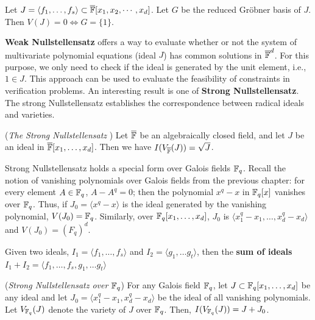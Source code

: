 \begin{Corollary}
	Let $J=\langle f_{1},\dots,f_{s} \rangle \subset \overline {{\mathbb{F}}}[x_1, x_2, \cdots, x_d]$. 
	Let $G$ be the reduced Gr\"obner basis of $J$. Then $V(J)=0 \iff G=\{1\}$.
\end{Corollary}

{\bf Weak Nullstellensatz} offers a way to evaluate whether or not the 
system of multivariate polynomial equations (ideal $J$) has common solutions 
in ${\overline {{\mathbb{F}}}}^d$. For this purpose, we only need to check if 
the ideal is generated by the unit element, i.e., $1\in J$. 
This approach can be used to evaluate the feasibility of constraints in 
verification problems.
An interesting result is one of {\bf Strong 
Nullstellensatz}.
The strong
Nullstellensatz establishes the correspondence between radical ideals
and varieties. 

\begin{Theorem}\label{thm:sns}
({\it The Strong Nullstellensatz} \cite{gb_book}) 
Let $\overline{{\mathbb{F}}}$ be an algebraically closed field, and let $J$
be an ideal in $\overline{{\mathbb{F}}}[x_1,\dots, x_d]$. 
Then we have $I(V_{\overline{{\mathbb{F}}}}(J)) =\sqrt{J}$. 
\end{Theorem}


Strong Nullstellensatz holds a special form over Galois fields ${\mathbb{F}}_{q}$.
Recall the notion of vanishing polynomials over Galois fields from the 
previous chapter: for every element $A \in {\mathbb{F}}_{q}$, $A-A^q = 0$; then the 
polynomial $x^q-x$ in ${\mathbb{F}}_{q}[x]$ vanishes over ${\mathbb{F}}_{q}$. Thus, if 
$J_0=\langle x^q-x \rangle$ is the ideal generated by the vanishing 
polynomial, $V(J_0)={\mathbb{F}}_{q}$. Similarly, over ${\mathbb{F}}_{q}[x_1,\dots,x_d]$, $J_0$ is 
$\langle x_1^q-x_1,\dots,x_d^q-x_d \rangle$ and $V(J_0)=(F_q)^d$.


\begin{Definition}
Given two ideals, $I_1=\langle f_1, \dots,f_s \rangle$ and 
$I_2=\langle g_1,\dots g_t\rangle$, then the {\bf sum of ideals} 
$I_1+I_2=\langle f_1,\dots,f_s,g_1,\dots g_t\rangle$
\end{Definition}

\begin{Theorem}
({\it Strong Nullstellensatz over ${\mathbb{F}}_{q}$})
For any Galois field ${\mathbb{F}}_{q}$, let $J \subset {\mathbb{F}}_{q}[x_1,\dots,x_d]$ be any ideal 
and let $J_0 = \langle x_1^q-x_1, x_d^q-x_d \rangle$ be the ideal of all
vanishing polynomials. Let $V_{{\mathbb{F}}_{q}}(J)$ denote the variety of $J$ over ${\mathbb{F}}_{q}$.
Then, $I(V_{{\mathbb{F}}_{q}}(J))=J+J_0$.
\end{Theorem}

